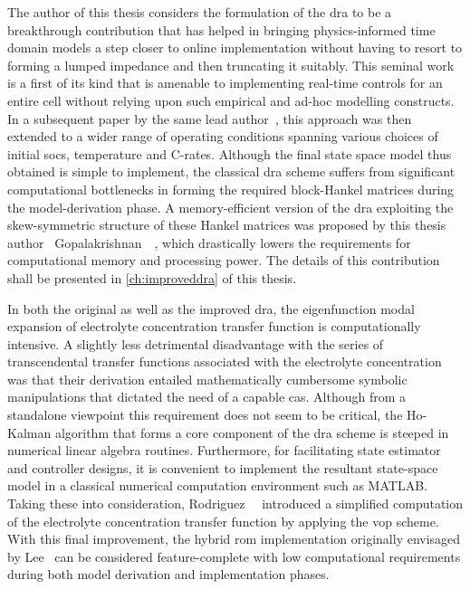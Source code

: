 The author  of this thesis  considers the formulation of  the \gls{dra} to  be a
breakthrough  contribution that  has  helped in  bringing physics-informed  time
domain models a step closer to online implementation without having to resort to
forming a lumped impedance and then truncating it suitably. This seminal work is
a first  of its  kind that  is amenable to  implementing real-time  controls for
an  entire  cell  without  relying  upon such  empirical  and  ad-hoc  modelling
constructs. In a  subsequent paper by the same  lead author~\cite{Lee2014}, this
approach was  then extended to  a wider  range of operating  conditions spanning
various  choices  of  initial  \glspl{soc}, temperature  and  C-rates.  Although
the  final  state  space  model  thus  obtained  is  simple  to  implement,  the
classical \gls{dra} scheme suffers from significant computational bottlenecks in
forming the  required block-Hankel  matrices during the  model-derivation phase.
A  memory-efficient  version  of  the \gls{dra}  exploiting  the  skew-symmetric
structure  of  these  Hankel  matrices   was  proposed  by  this  thesis  author
\ie~Gopalakrishnan~\etal{}~\cite{Gopalakrishnan2017},  which drastically  lowers
the requirements for  computational memory and processing power.  The details of
this contribution shall be presented in \cref{ch:improveddra} of this thesis.


In both the original as well  as the improved \gls{dra}, the eigenfunction modal
expansion  of electrolyte  concentration  transfer  function is  computationally
intensive.  A  slightly  less  detrimental   disadvantage  with  the  series  of
transcendental transfer functions associated  with the electrolyte concentration
was   that  their   derivation  entailed   mathematically  cumbersome   symbolic
manipulations that  dictated the need  of a  capable \gls{cas}. Although  from a
standalone  viewpoint  this  requirement  does  not seem  to  be  critical,  the
\mbox{Ho-Kalman}  algorithm  that  forms  a  core  component  of  the  \gls{dra}
scheme  is  steeped  in  numerical linear  algebra  routines.  Furthermore,  for
facilitating  state  estimator  and  controller designs,  it  is  convenient  to
implement the resultant  state-space model in a  classical numerical computation
environment   such  as   \textsc{MATLAB}.  Taking   these  into   consideration,
Rodriguez~\etal{}~\cite{Rodriguez2017}  introduced a  simplified computation  of
the  electrolyte  concentration  transfer  function by  applying  the  \gls{vop}
scheme.  With  this  final  improvement,  the  hybrid  \gls{rom}  implementation
originally envisaged by Lee~\etal{} can  be considered feature-complete with low
computational  requirements  during  both model  derivation  and  implementation
phases.


